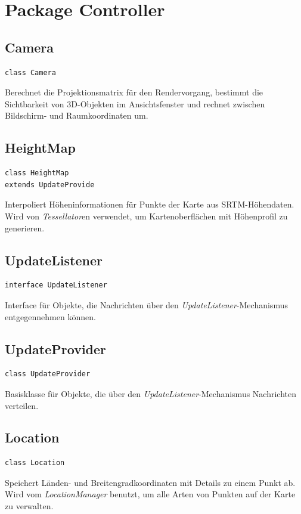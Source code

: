 \documentclass[10pt]{scrreprt}
\begin{document}
\section{Package Controller}
\subsection*{Camera}
\begin{lstlisting}
class Camera
\end{lstlisting}
Berechnet die Projektionsmatrix für den Rendervorgang, bestimmt die Sichtbarkeit von 3D-Objekten im Ansichtsfenster und rechnet zwischen Bildschirm- und Raumkoordinaten um.\\


\subsection*{HeightMap}
\begin{lstlisting}
class HeightMap
extends UpdateProvide
\end{lstlisting}
Interpoliert Höheninformationen für Punkte der Karte aus SRTM-Höhendaten. Wird von \textit{Tessellator}en verwendet, um Kartenoberflächen mit Höhenprofil zu generieren.\\



\subsection*{UpdateListener}
\begin{lstlisting}
interface UpdateListener
\end{lstlisting}
Interface für Objekte, die Nachrichten über den \textit{UpdateListener}-Mechanismus entgegennehmen können.\\


\subsection*{UpdateProvider}
\begin{lstlisting}
class UpdateProvider
\end{lstlisting}
Basisklasse für Objekte, die über den \textit{UpdateListener}-Mechanismus Nachrichten verteilen.\\



\subsection*{Location}
\begin{lstlisting}
class Location
\end{lstlisting}
Speichert Länden- und Breitengradkoordinaten mit Details zu einem Punkt ab. Wird vom \textit{LocationManager} benutzt, um alle Arten von Punkten auf der Karte zu verwalten. \\
\end{document}
